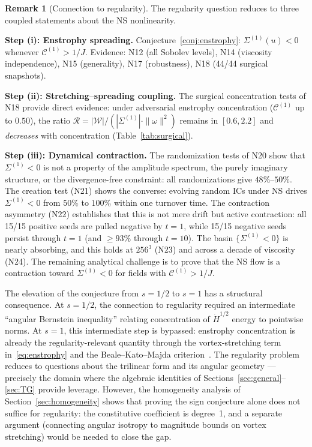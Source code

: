 \documentclass[11pt]{article}
\theoremstyle{definition}
\newtheorem{remark}[theorem]{Remark}
\newcommand{\Hdot}[1]{\dot{H}^{#1}}
\newcommand{\cC}{\mathcal{C}}
\begin{document}
\begin{remark}[Connection to regularity]
\label{rem:regularity-final}
The regularity question reduces to three coupled
statements about the NS nonlinearity.

\smallskip\noindent\textbf{Step (i): Enstrophy
spreading.}
Conjecture~\ref{conj:enstrophy}:
$\Sigma^{(1)}(u)<0$ whenever $\cC^{(1)}>1/J$.
Evidence: N12 (all Sobolev levels), N14 (viscosity
independence), N15 (generality), N17 (robustness),
N18 (44/44 surgical snapshots).

\smallskip\noindent\textbf{Step (ii):
Stretching--spreading coupling.}
The surgical concentration tests of N18 provide
direct evidence: under adversarial enstrophy
concentration ($\cC^{(1)}$ up to $0.50$), the ratio
$\mathcal{R} = |\mathcal{W}|/(|\Sigma^{(1)}|
\cdot\|\omega\|^2)$ remains in $[0.6, 2.2]$ and
\emph{decreases} with concentration
(Table~\ref{tab:surgical}).

\smallskip\noindent\textbf{Step (iii):
Dynamical contraction.}
The randomization tests of N20 show that
$\Sigma^{(1)}<0$ is not a property of the
amplitude spectrum, the purely imaginary
structure, or the divergence-free constraint:
all randomizations give $48\%$--$50\%$.
The creation test (N21) shows the
converse: evolving random ICs under NS drives
$\Sigma^{(1)}<0$ from $50\%$ to $100\%$ within
one turnover time.  The contraction asymmetry
(N22) establishes that this is not mere drift
but active contraction: all 15/15 positive seeds
are pulled negative by $t=1$, while
15/15 negative seeds persist through $t=1$ (and
$\geq 93\%$ through $t=10$).
The basin $\{\Sigma^{(1)}<0\}$ is nearly absorbing,
and this holds at $256^3$ (N23) and across a
decade of viscosity (N24).
The remaining analytical challenge is
to prove that the NS flow is a contraction
toward $\Sigma^{(1)}<0$ for fields with
$\cC^{(1)}>1/J$.
\end{remark}

The elevation of the conjecture from $s=1/2$ to $s=1$
has a structural consequence.  At $s=1/2$, the
connection to regularity required an intermediate
``angular Bernstein inequality'' relating concentration
of $\Hdot{1/2}$ energy to pointwise norms.  At $s=1$,
this intermediate step is bypassed: enstrophy
concentration is already the regularity-relevant
quantity through the vortex-stretching term
in~\eqref{eq:enstrophy} and the Beale--Kato--Majda
criterion~\cite{BKM}.  The regularity problem
reduces to questions about the trilinear form and its
angular geometry --- precisely the domain where the
algebraic identities of
Sections~\ref{sec:general}--\ref{sec:TG} provide
leverage.  However, the homogeneity analysis of
Section~\ref{sec:homogeneity} shows that proving
the sign conjecture alone does not suffice for
regularity: the constitutive coefficient is degree~1,
and a separate argument (connecting angular isotropy
to magnitude bounds on vortex stretching) would be
needed to close the gap.
\end{document}

